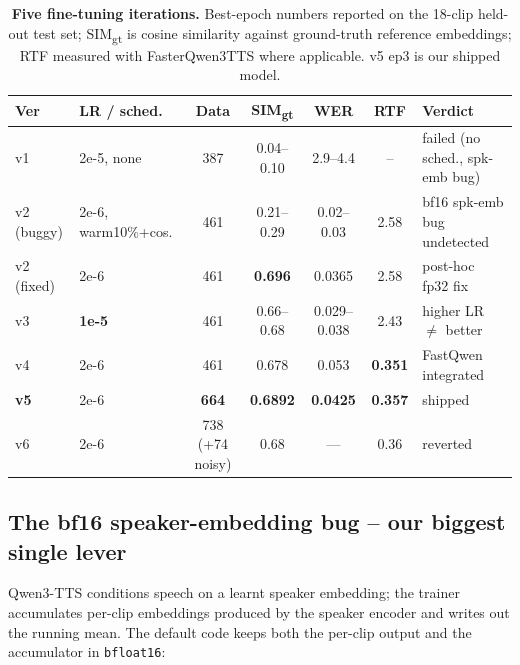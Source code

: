 \documentclass[10pt,a4paper]{article}
\begin{document}
\begin{table}[t]
\centering\small
\caption{\textbf{Five fine-tuning iterations.} Best-epoch numbers reported
on the 18-clip held-out test set; SIM\textsubscript{gt} is cosine
similarity against ground-truth reference embeddings; RTF measured with
FasterQwen3TTS where applicable. v5 ep3 is our shipped model.}
\label{tab:p1iters}
\footnotesize
\begin{tabular}{@{}llccccl@{}}
\toprule
\textbf{Ver} & \textbf{LR / sched.} & \textbf{Data} &
\textbf{SIM\textsubscript{gt}} & \textbf{WER} & \textbf{RTF} &
\textbf{Verdict} \\
\midrule
v1               & 2e-5, none           & 387             & 0.04--0.10 & 2.9--4.4     & --             & failed (no sched., spk-emb bug) \\
v2 (buggy)       & 2e-6, warm10\%+cos.  & 461             & 0.21--0.29 & 0.02--0.03   & 2.58           & bf16 spk-emb bug undetected \\
v2 (fixed)       & 2e-6                 & 461             & \textbf{0.696} & 0.0365   & 2.58           & post-hoc fp32 fix \\
v3               & \textbf{1e-5}        & 461             & 0.66--0.68 & 0.029--0.038 & 2.43           & higher LR $\ne$ better \\
v4               & 2e-6                 & 461             & 0.678      & 0.053        & \textbf{0.351} & FastQwen integrated \\
\rowcolor{success!8}
\textbf{v5}      & 2e-6                 & \textbf{664}    & \textbf{0.6892} & \textbf{0.0425} & \textbf{0.357} & shipped \\
v6               & 2e-6                 & 738 (+74 noisy) & 0.68       & ---          & 0.36           & reverted \\
\bottomrule
\end{tabular}
\end{table}

\subsection{The bf16 speaker-embedding bug -- our biggest single lever}

Qwen3-TTS conditions speech on a learnt speaker embedding; the trainer
accumulates per-clip embeddings produced by the speaker encoder and writes
out the running mean. The default code keeps both the per-clip output and
the accumulator in \texttt{bfloat16}:
\end{document}
